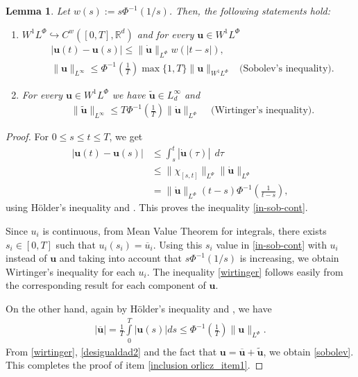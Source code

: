 \documentclass[twoside]{elsarticle}
\newtheorem{lem}[thm]{Lemma}
\theoremstyle{remark}
\newcommand{\orlnor}{\|_{L^{\Phi}}}
\newcommand{\lphi}{L^{\Phi}}
\newcommand{\lpsi}{L^{\Psi}}
\newcommand{\wphi}{W^{1}\lphi}
\newcommand{\sobnor}{\|_{W^{1}\lphi}}
\renewcommand{\b}[1]{\boldsymbol{#1}}
\newcommand{\rr}{\mathbb{R}}
\renewcommand{\leq}{\leqslant}
\begin{document}
\begin{lem}\label{inclusion orlicz} Let  $w(s):= s\Phi^{-1}(1/s)$. Then, the following statements hold:
\begin{enumerate}
\item\label{inclusion orlicz_item1} $\wphi\hookrightarrow C^w([0,T],\rr^d) $ and for every $\b{u}\in\wphi$
\begin{align}
 &\left|\b{u}(t)-\b{u}(s) \right| \leq  \|\b{\dot{u}}\orlnor w(| t-s|),&\label{in-sob-cont}
\\
& \|\b{u}\|_{L^{\infty}} \leq\Phi^{-1}\left(\frac{1}{T}\right)\max\{1,T\}\|\b{u}\sobnor&\text{(Sobolev's inequality).}\label{sobolev}
\end{align}
\item For every $\b{u}\in\wphi$ we have $\widetilde{\b{u}}\in L^{\infty}_d$ and 
\begin{align}
& \|\widetilde{\b{u}}\|_{L^{\infty}} \leq T\Phi^{-1}\left(\frac{1}{T}\right)\|\b{\dot u}\orlnor&\text{  (Wirtinger's inequality).}\label{wirtinger}
\end{align}




\end{enumerate}
\end{lem}

\begin{proof}
For $0 \leq
s\leq t \leq T $, we get
\begin{equation}\label{equicont}
\begin{split}
\left|\b{u}(t)-\b{u}(s) \right| &\leq \int_{s}^t \left| \b{\dot{u}}(\tau)\right|\ \ d\tau\\
&\leq \| \chi_{[s,t]}\|_{\lpsi}\|\b{\dot{u}}\|_{\lphi}\\
&= \|\b{\dot{u}}\|_{\lphi} ( t-s)\Phi^{-1}\left(\frac{1}{t-s}\right),
\end{split}
\end{equation}
using H\"older's inequality and \cite[Eq. (9.11)]{KR}.
This proves the inequality \eqref{in-sob-cont}.

Since $u_i$ is continuous, from Mean Value Theorem for integrals, 
there exists  $s_i\in [0,T]$ such that $u_i(s_i)=\overline{u}_i$.
Using this $s_i$ value in \eqref{in-sob-cont} with $u_i$ instead of $\b{u}$ and taking into account that $s\Phi^{-1}(1/s)$ is increasing, 
we obtain  Wirtinger's inequality for each $u_i$. The inequality \eqref{wirtinger} 
follows easily from the corresponding result for each component of $\b{u}$.

On the other hand, again by H\"older's inequality and \cite[Eq. (9.11)]{KR}, we have
\begin{equation}\label{desigualdad2}\begin{split}
|\overline{\b{u}}|= \frac{1}{T}\int\limits_{0}^{T}|\b{u}(s)|ds\leq \Phi^{-1}\left(\frac{1}{T}\right)\|\b{u}\orlnor.
\end{split}
\end{equation}
From \eqref{wirtinger}, \eqref{desigualdad2} and the fact that $\b{u}=\overline{\b{u}}+\widetilde{\b{u}}$,  we obtain \eqref{sobolev}. This completes the proof of item \ref{inclusion orlicz_item1}.
\end{proof}
\end{document}
